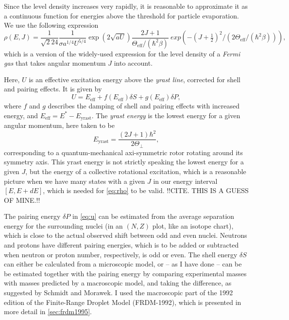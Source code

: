 Since the level density increases very rapidly, it is reasonable to approximate it as a continuous function  for energies above the threshold for particle evaporation.
We use the following expression
\begin{equation}
\rho(E,J) = \frac{1}{\sqrt{2}24}
\frac{1}{\sigma a^{1/4} U^{5/4}} \exp{(2\sqrt{aU})}
\frac{2J+1}{\Theta_\text{eff}/(\hbar^2\beta)}\ exp{\left(-(J+\tfrac{1}{2})^2/(2\Theta_\text{eff}/(\hbar^2\beta))\right)},\label{eq:rho}
\end{equation}
which is a version of the widely-used expression for the level density of a \emph{Fermi gas} that takes angular momentum $J$ into account\cite{ripl:2006}.

Here, $U$ is an effective excitation energy above the \emph{yrast line}, corrected for shell and pairing effects. It is given by
\begin{equation}
U=E_\text{eff} + f(E_\text{eff})\delta S + g(E_\text{eff})\delta P,\label{eq:u}
\end{equation}
where $f$ and $g$ describes the damping of shell and pairing effects with increased energy, and $E_\text{eff} = E^*-E_\text{yrast}$. The \emph{yrast energy} is the lowest energy for a given angular momentum, here taken to be
\begin{equation}
E_\text{yrast} = \frac{(2J+1)\hbar^2}{2\Theta_\perp},
\end{equation}
corresponding to a quantum-mechanical axi-symmetric rotor rotating around its symmetry axis. This yrast energy is not strictly speaking the lowest energy for a given $J$, but the energy of a collective rotational excitation, which is a reasonable picture when we have many states with a given $J$ in our energy interval $[E,E+dE]$, which is needed for \eqref{eq:rho} to be valid. !!CITE. THIS IS A GUESS OF MINE.!!

The pairing energy $\delta P$ in \eqref{eq:u} can be estimated from the average separation energy for the surrounding nuclei (in an $(N,Z)$ plot, like an isotope chart), which is close to the actual observed shift between odd and even nuclei\cite{ericson:1960}. Neutrons and protons have different pairing energies, which is to be added or subtracted when neutron or proton number, respectively, is odd or even. 
The shell energy $\delta S$ can either be calculated from a microscopic model, or -- as I have done -- can be be estimated together with the pairing energy by comparing experimental masses with masses predicted by a macroscopic model, and taking the difference, as suggested by Schmidt and Morawek\cite{schmidt:1991:art}. I used the macroscopic part of the 1992 edition of the Finite-Range Droplet Model (FRDM-1992)\cite{moller1995}, which is presented in more detail in \autoref{sec:frdm1995}.


